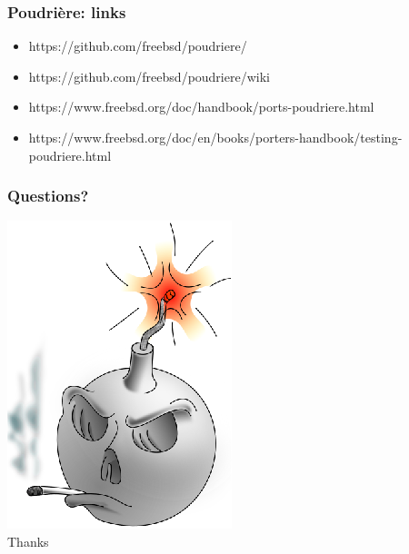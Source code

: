 \begin{frame}
	\frametitle{Poudrière: links}
	\begin{itemize}
		\item https://github.com/freebsd/poudriere/
		\item https://github.com/freebsd/poudriere/wiki
		\item https://www.freebsd.org/doc/handbook/ports-poudriere.html
		\item https://www.freebsd.org/doc/en/books/porters-handbook/testing-poudriere.html
	\end{itemize}
\end{frame}

\begin{frame}
	\frametitle{Questions?}
	\center
	\includegraphics{poudriere.eps}
	\\
	\Huge Thanks
\end{frame}


